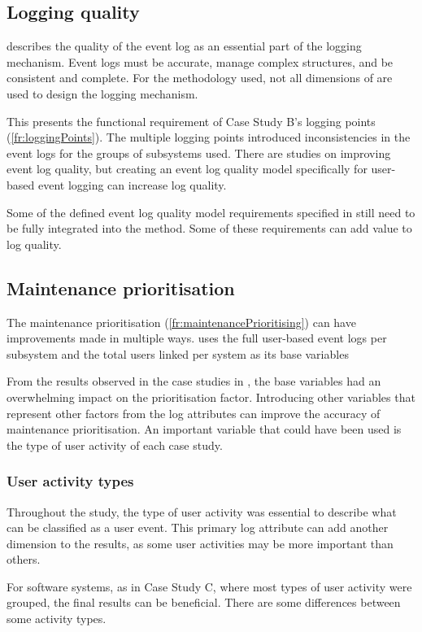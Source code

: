 \subsection{Logging quality}
 describes the quality of the event log as an essential part of the logging mechanism. Event logs must be accurate, manage complex structures, and be consistent and complete. For the methodology used, not all dimensions of  are used to design the logging mechanism.\par This presents the functional requirement of Case Study B's logging points (\ref{fr:loggingPoints}). The multiple logging points introduced inconsistencies in the event logs for the groups of subsystems used. There are studies on improving event log quality, but creating an event log quality model specifically for user-based event logging can increase log quality. \par Some of the defined event log quality model requirements specified in  still need to be fully integrated into the method. Some of these requirements can add value to log quality.

\subsection{Maintenance prioritisation}
The maintenance prioritisation (\ref{fr:maintenancePrioritising}) can have improvements made in multiple ways.  uses the full user-based event logs per subsystem and the total users linked per system as its base variables\par From the results observed in the case studies in , the base variables had an overwhelming impact on the prioritisation factor. Introducing other variables that represent other factors from the log attributes can improve the accuracy of maintenance prioritisation. An important variable that could have been used is the type of user activity of each case study.

\subsubsection{User activity types}
Throughout the study, the type of user activity was essential to describe what can be classified as a user event. This primary log attribute can add another dimension to the results, as some user activities may be more important than others. \par For software systems, as in Case Study C, where most types of user activity were grouped, the final results can be beneficial. There are some differences between some activity types. 

